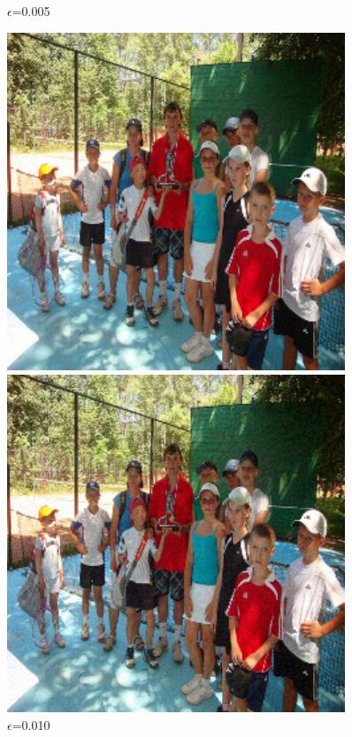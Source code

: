 \begin{figure}[h]
\begin{minipage}{0.12\textwidth}
        \caption*{$\epsilon$=0.005}
    \end{minipage}\hfill
    \begin{minipage}{0.12\textwidth}
        \centering
        \includegraphics[width=0.9\textwidth]{figures/group_of_people/group_of_people_0.010.png}
        \caption*{$\epsilon$=0.010}
    \end{minipage}\hfill
    \begin{minipage}{0.12\textwidth}
        \centering
        \includegraphics[width=0.9\textwidth]{figures/group_of_people/group_of_people_0.020.png}

\end{minipage}
\end{figure}
